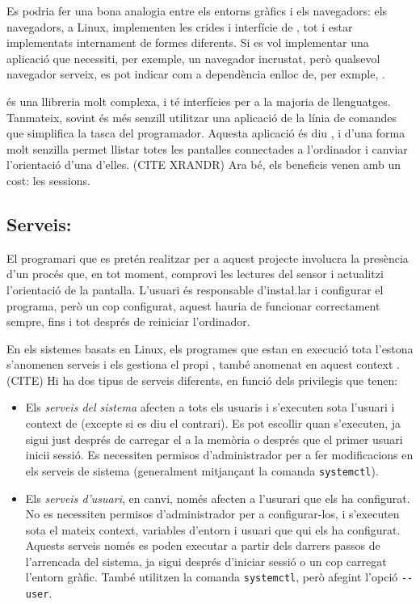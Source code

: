 Es podria fer una bona analogia entre
els entorns gràfics i els navegadors: els navegadors, a Linux, implementen les
crides i interfície de , tot i estar implementats internament
de formes diferents. Si es vol implementar una aplicació que necessiti, per
exemple, un navegador incrustat, però qualsevol navegador serveix, es pot
indicar com a dependència  enlloc de, per exmple, .

 és una llibreria molt complexa, i té interfícies per a la majoria
de llenguatges. Tanmateix, sovint és més senzill utilitzar una aplicació de
la línia de comandes que simplifica la tasca del programador. Aquesta
aplicació és diu , i d'una forma molt senzilla permet llistar
totes les pantalles connectades a l'ordinador i canviar l'orientació
d'una d'elles. (CITE XRANDR) Ara bé, els beneficis venen amb un cost: les sessions.

\subsection{Serveis: }

El programari que es pretén realitzar per a aquest projecte involucra la
presència d'un procés que, en tot moment, comprovi les lectures del sensor i
actualitzi l'orientació de la pantalla. L'usuari és responsable d'insta\l.lar i
configurar el programa, però un cop configurat, aquest hauria de funcionar
correctament sempre, fins i tot després de reiniciar l'ordinador.

En els sistemes basats en Linux, els programes que estan en execució tota
l'estona s'anomenen serveis i els gestiona el propi , també anomenat
en aquest context . (CITE) Hi ha dos tipus de serveis diferents, en
funció dels privilegis que tenen:

\begin{itemize}
    \item Els \textit{serveis del sistema} afecten a tots els usuaris i
    s'executen sota l'usuari i context de  (excepte si es diu
    el contrari). Es pot escollir quan s'executen, ja sigui just després de
    carregar el  a la memòria o després que el primer usuari
    inicii sessió. Es necessiten permisos d'administrador per a fer modificacions
    en els serveis de sistema (generalment mitjançant la comanda
    \verb|systemctl|).
    \item Els \textit{serveis d'usuari}, en canvi, només afecten a l'usurari
    que els ha configurat. No es necessiten permisos d'administrador per a
    configurar-los, i s'executen sota el mateix context, variables d'entorn i
    usuari que qui els ha configurat. Aquests serveis només es poden executar a
    partir dels darrers passos de l'arrencada del sistema, ja sigui després
    d'iniciar sessió o un cop carregat l'entorn gràfic. També utilitzen la
    comanda \verb|systemctl|, però afegint l'opció \verb|--user|.
\end{itemize}

